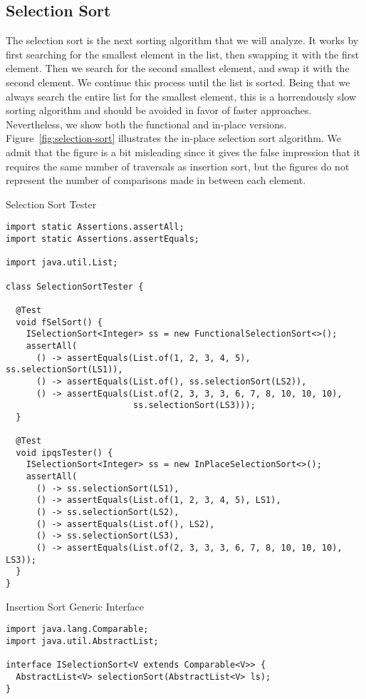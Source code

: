 \subsection*{Selection Sort}
The selection sort is the next sorting algorithm that we will analyze. It works by first searching for the smallest element in the list, then swapping it with the first element. Then we search for the second smallest element, and swap it with the second element. We continue this process until the list is sorted. Being that we always search the entire list for the smallest element, this is a horrendously slow sorting algorithm and should be avoided in favor of faster approaches. Nevertheless, we show both the functional and in-place versions. Figure~\ref{fig:selection-sort} illustrates the in-place selection sort algorithm. We admit that the figure is a bit misleading since it gives the false impression that it requires the same number of traversals as insertion sort, but the figures do not represent the number of comparisons made in between each element.

\begin{cl}[]{Selection Sort Tester}
\begin{lstlisting}[language=MyJava]
import static Assertions.assertAll;
import static Assertions.assertEquals;

import java.util.List;

class SelectionSortTester {

  @Test
  void fSelSort() {
    ISelectionSort<Integer> ss = new FunctionalSelectionSort<>();
    assertAll(
      () -> assertEquals(List.of(1, 2, 3, 4, 5), ss.selectionSort(LS1)),
      () -> assertEquals(List.of(), ss.selectionSort(LS2)),
      () -> assertEquals(List.of(2, 3, 3, 3, 6, 7, 8, 10, 10, 10), 
                         ss.selectionSort(LS3)));
  }

  @Test
  void ipqsTester() {
    ISelectionSort<Integer> ss = new InPlaceSelectionSort<>();
    assertAll(
      () -> ss.selectionSort(LS1),
      () -> assertEquals(List.of(1, 2, 3, 4, 5), LS1),
      () -> ss.selectionSort(LS2),
      () -> assertEquals(List.of(), LS2),
      () -> ss.selectionSort(LS3),
      () -> assertEquals(List.of(2, 3, 3, 3, 6, 7, 8, 10, 10, 10), LS3));
  }
}
\end{lstlisting}
\end{cl}

\begin{cl}[]{Insertion Sort Generic Interface}
\begin{lstlisting}[language=MyJava]
import java.lang.Comparable;
import java.util.AbstractList;

interface ISelectionSort<V extends Comparable<V>> {
  AbstractList<V> selectionSort(AbstractList<V> ls);
}
\end{lstlisting}
\end{cl}

